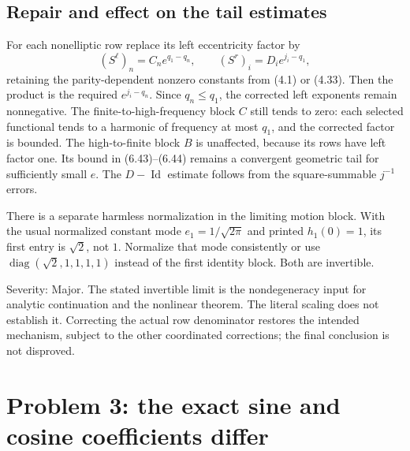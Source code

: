 \documentclass[10pt]{article}
\begin{document}
\subsection*{Repair and effect on the tail estimates}
For each nonelliptic row replace its left eccentricity factor by \[(S^\ell)_n=C_n e^{q_1-q_n},
 \qquad
 (S^r)_i=D_i e^{j_i-q_1},\] retaining the parity-dependent nonzero constants from (4.1) or (4.33). Then the product is the required \(e^{j_i-q_n}\). Since \(q_n\leq q_1\), the corrected left exponents remain nonnegative. The finite-to-high-frequency block \(C\) still tends to zero: each selected functional tends to a harmonic of frequency at most \(q_1\), and the corrected factor is bounded. The high-to-finite block \(B\) is unaffected, because its rows have left factor one. Its bound in (6.43)–(6.44) remains a convergent geometric tail for sufficiently small \(e\). The \(D-\operatorname{Id}\) estimate follows from the square-summable \(j^{-1}\) errors.\par
There is a separate harmless normalization in the limiting motion block. With the usual normalized constant mode \(e_1=1/\sqrt{2\pi}\) and printed \(h_1(0)=1\), its first entry is \(\sqrt2\), not \(1\). Normalize that mode consistently or use \(\operatorname{diag}(\sqrt2,1,1,1,1)\) instead of the first identity block. Both are invertible.\par
Severity: Major. The stated invertible limit is the nondegeneracy input for analytic continuation and the nonlinear theorem. The literal scaling does not establish it. Correcting the actual row denominator restores the intended mechanism, subject to the other coordinated corrections; the final conclusion is not disproved.\par
\section*{Problem 3: the exact sine and cosine coefficients differ}
\end{document}
